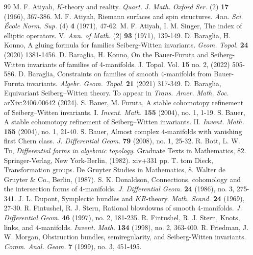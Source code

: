 \documentclass{amsart}
\theoremstyle{definition}
\theoremstyle{remark}
\numberwithin{equation}{section}
\begin{document}






\begin{thebibliography}{99}
M. F. Atiyah, $K$-theory and reality. {\em Quart. J. Math. Oxford Ser.} (2) {\bf 17} (1966), 367-386.
M. F. Atiyah, Riemann surfaces and spin structures. {\em Ann. Sci. \'Ecole Norm. Sup.} (4) {\bf 4} (1971), 47-62. 
M. F. Atiyah, I. M. Singer, The index of elliptic operators. V. {\em Ann. of Math.} (2) {\bf 93} (1971), 139-149. 
D. Baraglia, H. Konno, A gluing formula for families Seiberg-Witten invariants. {\em Geom. Topol.} {\bf 24} (2020) 1381-1456.
D. Baraglia, H. Konno, On the Bauer-Furuta and Seiberg-Witten invariants of families of 4-manifolds. {J. Topol.} Vol. {\bf 15} no. 2, (2022) 505-586.
D. Baraglia, Constraints on families of smooth 4-manifolds from Bauer-Furuta invariants. {\em Algebr. Geom. Topol.} {\bf 21} (2021) 317-349.
D. Baraglia, Equivariant Seiberg--Witten theory. To appear in {\em Trans. Amer. Math. Soc.} arXiv:2406.00642 (2024).
S. Bauer, M. Furuta, A stable cohomotopy refinement of Seiberg--Witten invariants. I. {\em Invent. Math.} {\bf 155} (2004), no. 1, 1-19. 
S. Bauer, A stable cohomotopy refinement of Seiberg--Witten invariants. II. {\em Invent. Math.} {\bf 155} (2004), no. 1, 21-40. 
S. Bauer, Almost complex $4$-manifolds with vanishing first Chern class. {\em J. Differential Geom.} {\bf 79} (2008), no. 1, 25-32. 
R. Bott, L. W. Tu, {\em Differential forms in algebraic topology}. Graduate Texts in Mathematics, 82. Springer-Verlag, New York-Berlin, (1982). xiv+331 pp.
T. tom Dieck, Transformation groups. De Gruyter Studies in Mathematics, 8. Walter de Gruyter \& Co., Berlin, (1987). 
S. K. Donaldson, Connections, cohomology and the intersection forms of $4$-manifolds. {\em J. Differential Geom.} {\bf 24} (1986), no. 3, 275-341. 
J. L. Dupont, Symplectic bundles and $KR$-theory. {\em Math. Scand.} {\bf 24} (1969), 27-30. 
R. Fintushel, R. J. Stern, Rational blowdowns of smooth $4$-manifolds. {\em J. Differential Geom.} {\bf 46} (1997), no. 2, 181-235. 
R. Fintushel, R. J. Stern, Knots, links, and $4$-manifolds. {\em Invent. Math.} {\bf 134} (1998), no. 2, 363-400. 
R. Friedman, J. W. Morgan, Obstruction bundles, semiregularity, and Seiberg-Witten invariants. {\em Comm. Anal. Geom.} {\bf 7} (1999), no. 3, 451-495. 

\end{thebibliography}
\end{document}
